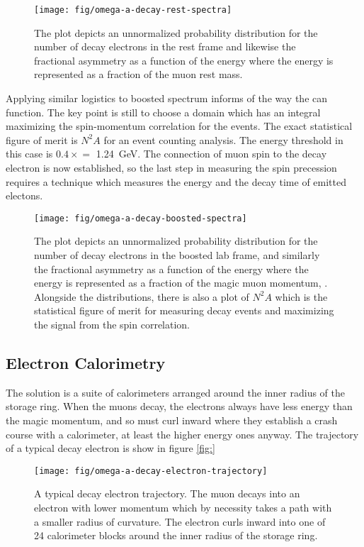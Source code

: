 \begin{figure}
\label{fig:omega-a-decay-rest-spectra}
\texttt{[image: fig/omega-a-decay-rest-spectra]}
\caption{The plot depicts an unnormalized probability distribution for the number of decay electrons in the rest frame and likewise the fractional asymmetry as a function of the energy where the energy is represented as a fraction of the muon rest mass.}
\end{figure}

Applying similar logistics to boosted spectrum informs of the way the \gmtwo can function.  The key point is still to choose a domain which has an integral maximizing the spin-momentum correlation for the events.  The exact statistical figure of merit is $N^2A$ for an event counting analysis.  The energy threshold in this case is $0.4\times$\pmagic$ = $ \SI{1.24}{\GeV}.  The connection of muon spin to the decay electron is now established, so the last step in measuring the spin precession requires a technique which measures the energy and the decay time of emitted electons.

\begin{figure}
\label{fig:omega-a-decay-boosted-spectra}
\texttt{[image: fig/omega-a-decay-boosted-spectra]}
\caption{The plot depicts an unnormalized probability distribution for the number of decay electrons in the boosted lab frame, and similarly the fractional asymmetry as a function of the energy where the energy is represented as a fraction of the magic muon momentum, \pmagic. Alongside the distributions, there is also a plot of $N^2A$ which is the statistical figure of merit for measuring decay events and maximizing the signal from the spin correlation.}
\end{figure}

\subsection{Electron Calorimetry}

The solution is a suite of calorimeters arranged around the inner radius of the storage ring.  When the muons decay, the electrons always have less energy than the magic momentum, and so must curl inward where they establish a crash course with a calorimeter, at least the higher energy ones anyway. The trajectory of a typical decay electron is show in figure \ref{fig:}

\begin{figure}
\label{fig:omega-a-decay-electron-trajectory}
\texttt{[image: fig/omega-a-decay-electron-trajectory]}
\caption{A typical decay electron trajectory.  The muon decays into an electron with lower momentum which by necessity takes a path with a smaller radius of curvature.  The electron curls inward into one of 24 calorimeter blocks around the inner radius of the storage ring.}
\end{figure}

